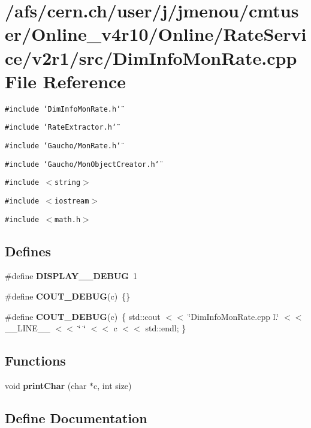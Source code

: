 \section{/afs/cern.ch/user/j/jmenou/cmtuser/Online\_\-v4r10/Online/Rate\-Service/v2r1/src/Dim\-Info\-Mon\-Rate.cpp File Reference}
\label{DimInfoMonRate_8cpp}
{\tt \#include \char`\"{}Dim\-Info\-Mon\-Rate.h\char`\"{}}\par
{\tt \#include \char`\"{}Rate\-Extractor.h\char`\"{}}\par
{\tt \#include \char`\"{}Gaucho/Mon\-Rate.h\char`\"{}}\par
{\tt \#include \char`\"{}Gaucho/Mon\-Object\-Creator.h\char`\"{}}\par
{\tt \#include $<$string$>$}\par
{\tt \#include $<$iostream$>$}\par
{\tt \#include $<$math.h$>$}\par
\subsection*{Defines}
\begin{CompactItemize}
\item 
\#define {\bf DISPLAY\_\-\_\-DEBUG}~1
\item 
\#define {\bf COUT\_\-DEBUG}(c)~\{\}
\item 
\#define {\bf COUT\_\-DEBUG}(c)~\{ std::cout $<$$<$ \char`\"{}Dim\-Info\-Mon\-Rate.cpp l.\char`\"{} $<$$<$ \_\-\_\-LINE\_\-\_\- $<$$<$ \char`\"{} \char`\"{} $<$$<$ c $<$$<$ std::endl; \}
\end{CompactItemize}
\subsection*{Functions}
\begin{CompactItemize}
\item 
void {\bf print\-Char} (char $\ast$c, int size)
\end{CompactItemize}


\subsection{Define Documentation}
